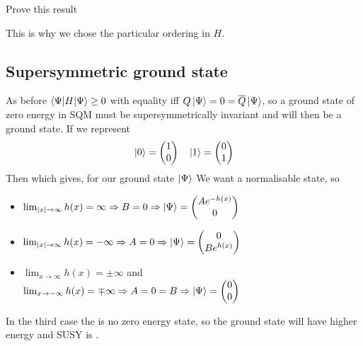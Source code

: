 \documentclass{article}
\begin{document}
\begin{ex}
Prove this result
\end{ex}

This is why we chose the particular ordering in $H$. 

\subsection{Supersymmetric ground state}
As before $\braket{\Psi|H|\Psi}\geq 0$ with equality iff $Q\ket{\Psi}=0=\overline{Q}\ket{\Psi}$, so a ground state of zero energy in SQM must be supersymmetrically invariant and will then be a ground state. If we represent 
\[
\ket{0} = \begin{pmatrix} 1 \\ 0 \end{pmatrix} \quad \ket{1} = \begin{pmatrix} 0 \\ 1 \end{pmatrix}
\]
Then 
which gives, for our ground state $\ket{\Psi}$
We want a normalisable state, so 
\begin{itemize}
    \item $\lim_{|x|\to\infty} h(x) = \infty \Rightarrow B=0 \Rightarrow \ket{\Psi} = \begin{pmatrix} A e^{-h(x)} \\ 0 \end{pmatrix}$ 
    \item $\lim_{|x|\to\infty} h(x) = -\infty \Rightarrow A=0 \Rightarrow \ket{\Psi} = \begin{pmatrix} 0 \\ B e^{h(x)} \end{pmatrix}$ 
    \item $\lim_{x\to\infty} h(x) = \pm\infty$ and $\lim_{x\to -\infty} h(x) = \mp\infty\Rightarrow A=0=B \Rightarrow \ket{\Psi} = \begin{pmatrix} 0 \\ 0 \end{pmatrix}$ 
\end{itemize}
In the third case the is no zero energy state, so the ground state will have higher energy and SUSY is . 
\end{document}
